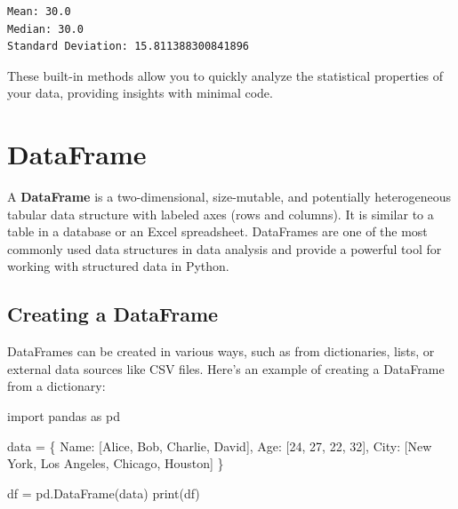 \documentclass[
  letterpaper,
  DIV=11,
  numbers=noendperiod]{scrreprt}
\newenvironment{Shaded}{\begin{snugshade}}{\end{snugshade}}
\newcommand{\BuiltInTok}[1]{\textcolor[rgb]{0.00,0.23,0.31}{#1}}
\newcommand{\DecValTok}[1]{\textcolor[rgb]{0.68,0.00,0.00}{#1}}
\newcommand{\ImportTok}[1]{\textcolor[rgb]{0.00,0.46,0.62}{#1}}
\newcommand{\NormalTok}[1]{\textcolor[rgb]{0.00,0.23,0.31}{#1}}
\newcommand{\OperatorTok}[1]{\textcolor[rgb]{0.37,0.37,0.37}{#1}}
\newcommand{\StringTok}[1]{\textcolor[rgb]{0.13,0.47,0.30}{#1}}
\begin{document}
\begin{verbatim}
Mean: 30.0
Median: 30.0
Standard Deviation: 15.811388300841896
\end{verbatim}

These built-in methods allow you to quickly analyze the statistical
properties of your data, providing insights with minimal code.

\hypertarget{dataframe}{%
\section{DataFrame}\label{dataframe}}

A \textbf{DataFrame} is a two-dimensional, size-mutable, and potentially
heterogeneous tabular data structure with labeled axes (rows and
columns). It is similar to a table in a database or an Excel
spreadsheet. DataFrames are one of the most commonly used data
structures in data analysis and provide a powerful tool for working with
structured data in Python.

\hypertarget{creating-a-dataframe}{%
\subsection{Creating a DataFrame}\label{creating-a-dataframe}}

DataFrames can be created in various ways, such as from dictionaries,
lists, or external data sources like CSV files. Here's an example of
creating a DataFrame from a dictionary:

\begin{Shaded}
\begin{Highlighting}[]
\ImportTok{import}\NormalTok{ pandas }\ImportTok{as}\NormalTok{ pd}

\NormalTok{data }\OperatorTok{=}\NormalTok{ \{}
    \StringTok{\textquotesingle{}Name\textquotesingle{}}\NormalTok{: [}\StringTok{\textquotesingle{}Alice\textquotesingle{}}\NormalTok{, }\StringTok{\textquotesingle{}Bob\textquotesingle{}}\NormalTok{, }\StringTok{\textquotesingle{}Charlie\textquotesingle{}}\NormalTok{, }\StringTok{\textquotesingle{}David\textquotesingle{}}\NormalTok{],}
    \StringTok{\textquotesingle{}Age\textquotesingle{}}\NormalTok{: [}\DecValTok{24}\NormalTok{, }\DecValTok{27}\NormalTok{, }\DecValTok{22}\NormalTok{, }\DecValTok{32}\NormalTok{],}
    \StringTok{\textquotesingle{}City\textquotesingle{}}\NormalTok{: [}\StringTok{\textquotesingle{}New York\textquotesingle{}}\NormalTok{, }\StringTok{\textquotesingle{}Los Angeles\textquotesingle{}}\NormalTok{, }\StringTok{\textquotesingle{}Chicago\textquotesingle{}}\NormalTok{, }\StringTok{\textquotesingle{}Houston\textquotesingle{}}\NormalTok{]}
\NormalTok{\}}

\NormalTok{df }\OperatorTok{=}\NormalTok{ pd.DataFrame(data)}
\BuiltInTok{print}\NormalTok{(df)}
\end{Highlighting}
\end{Shaded}
\end{document}
